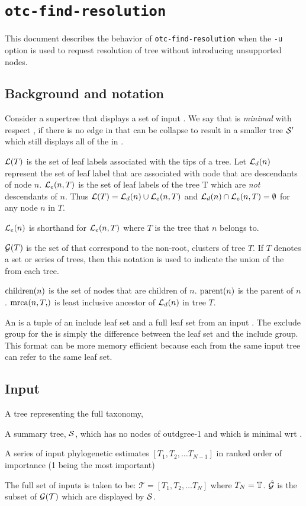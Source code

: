 \documentclass[11pt]{article}
\begin{document}
\section*{\texttt{otc-find-resolution}}
This document describes the behavior of \texttt{otc-find-resolution} when the \texttt{-u}
    option is used to request resolution of tree without introducing unsupported nodes.

\subsection*{Background and notation}
Consider a supertree \summaryTree that displays a set of input \pss \pssInOptimalTree.
We say that \summaryTree is {\em minimal} with respect \pssInOptimalTree, if there is
    no edge in \summaryTree that can be collapse to result in a smaller tree $\mathcal{S}^{\prime}$
    which still displays all of the \pss in \pssInOptimalTree.

$\mathcal{L}(T)$ is the set of leaf labels associated with the tips of a tree.
Let $\mathcal{L}_d(n)$ represent the set of leaf label that are associated with node that are descendants
    of node $n$.
$\mathcal{L}_e(n, T)$ is the set of leaf labels of the tree T which are {\em not} descendants of $n$.
Thus $\mathcal{L}(T) = \mathcal{L}_d(n) \cup \mathcal{L}_e(n,T)$ and $\mathcal{L}_d(n) \cap \mathcal{L}_e(n,T)=\emptyset$ for any node $n$ in $T$.

$\mathcal{L}_e(n)$ is shorthand for $\mathcal{L}_e(n, T)$ where $T$ is the tree that $n$ belongs to.

$\mathcal{G}(T)$ is the set of \pss that correspond to the non-root, clusters of tree $T$.
If $T$ denotes a set or series of trees, then this notation is used to indicate the union of the \pss from each tree.

$\mbox{children}(n)$ is the set of nodes that are children of $n$.
$\mbox{parent}(n)$ is the parent of $n$.
$\mrca{n, T}$ is least inclusive ancestor of $\mathcal{L}_d(n)$ in tree $T$.

An \incLSSS is a tuple of an include leaf set and a full leaf set from an input \pss.
The exclude group for the \pss is simply the difference between the leaf set and the include group.
This format can be more memory efficient because each \incLSSS from the same input tree
can refer to the same leaf set.

\subsection*{Input}
\begin{compactitem}
    \item A tree representing the full taxonomy, \taxonomy
    \item A summary tree, $\mathcal{S}$, which has no nodes of outdgree-1 and which is minimal wrt \pssInOptimalTree.
    \item A series of input phylogenetic estimates  $[T_1, T_2, \ldots T_{N-1}]$ in ranked order of importance (1 being the most important)
\end{compactitem}
The full set of inputs is taken to be: $\mathcal{T} = [T_1, T_2, \ldots T_{N}]$ where $T_N = \mathbb{T}$.
    $\hat{\mathcal{G}}$ is the subset of $\mathcal{G}(\mathcal{T})$ which are displayed by $\mathcal{S}$.
\end{document}
